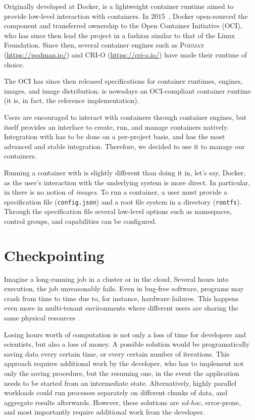 Originally developed at Docker, \runc is a lightweight container runtime aimed to provide low-level interaction with containers.
In 2015~\cite{introducing-runc}, Docker open-sourced the component and transferred ownership to the Open Container Initiative (OCI), who has since then lead the project in a fashion similar to that of the Linux Foundation.
Since then, several container engines such as \textsc{Podman} (\url{https://podman.io/}) and \textsc{CRI-O} (\url{https://cri-o.io/}) have made \runc their runtime of choice.

The OCI has since then released specifications for container runtimes, engines, images, and image distribution.
\runc is nowadays an OCI-compliant container runtime (it is, in fact, the reference implementation).

Users are encouraged to interact with containers through container engines, but \runc itself provides an interface to create, run, and manage containers natively.
Integration with \criu has to be done on a per-project basis, and \runc has the most advanced and stable integration.
Therefore, we decided to use it to manage our containers.

Running a container with \runc is slightly different than doing it in, let's say, Docker, as the user's interaction with the underlying system is more direct.
In particular, in \runc there is no notion of \textit{images}.
To run a container, a user must provide a specification file (\texttt{config.json}) and a root file system in a directory (\texttt{rootfs}).
Through the specification file several low-level options such as namespaces, control groups, and capabilities can be configured.

\section{Checkpointing} \label{sec:bg-cp}

Imagine a long-running job in a cluster or in the cloud.
Several hours into execution, the job unreasonably fails.
Even in bug-free software, programs may crash from time to time due to, for instance, hardware failures.
This happens even more in multi-tenant environments where different users are sharing the same physical resources~\cite{Barker2014}.

Losing hours worth of computation is not only a loss of time for developers and scientists, but also a loss of money.
A possible solution would be programatically saving data every certain time, or every certain number of iterations.
This approach requires additional work by the developer, who has to implement not only the saving procedure, but the resuming one, in the event the application needs to be started from an intermediate state.
Alternatively, highly parallel workloads could run processes separately on different chunks of data, and aggregate results afterwards.
However, these solutions are \textit{ad-hoc}, error-prone, and most importantly require additional work from the developer.

